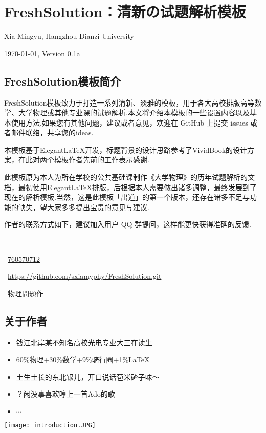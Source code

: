 \chapter{FreshSolution：清新の试题解析模板}
\centerline{Xia Mingyu, Hangzhou Dianzi University}

\centerline{\today, Version 0.1a}
\section{FreshSolution模板简介}
{
\color{Periwinkle}FreshSolution模板致力于打造一系列清新、淡雅的模板，用于各大高校排版高等数学、大学物理或其他专业课的试题解析.本文将介绍本模板的一些设置内容以及基本使用方法.如果您有其他问题，建议或者意见，欢迎在 GitHub 上提交 issues 或者邮件联络，共享您的ideas.

本模板基于Elegant\LaTeX 开发，标题背景的设计思路参考了VividBook的设计方案，在此对两个模板作者先前的工作表示感谢.

此模板原为本人为所在学校的公共基础课制作《大学物理》的历年试题解析的文档，最初使用Elegant\LaTeX 排版，后根据本人需要做出诸多调整，最终发展到了现在的解析模板.当然，这是此模板「出道」的第一个版本，还存在诸多不足与功能的缺失，望大家多多提出宝贵的意见与建议.

作者的联系方式如下，建议加入用户 QQ 群提问，这样能更快获得准确的反馈.

\begin{multicols}{2}

    \faEnvelope\ 
    
    \faQq\ \href{https://qm.qq.com/cgi-bin/qm/qr?k=gg5GsqSkGvZbC6TphVMlXRl08vqMV9Lw&authKey=rDcxqMdHwxWLQQBZwgfHduopCmVulM8CTWUhsGFOWyjqo6Ekk0omdoi4kuzxC/k4&noverify=0}{760570712}

    \faGithub\ \href{https://github.com/xiamyphys/FreshSolution.git}{https://github.com/sxiamyphy/FreshSolution.git}

    \faWechat\ \href{http://weixin.qq.com/r/hR1SSofEIdpercMp90iX}{物理問題作}
\end{multicols}

\newpage
\begin{multicols}{2}
\section{关于作者}
\bfseries
    \begin{itemize}
        \item 钱江北岸某不知名高校光电专业大三在读生
        \item 60\%物理+30\%数学+9\%骑行圈+1\%\LaTeX
        \item 土生土长的东北银儿，开口说话苞米碴子味～
        \item ？闲没事喜欢哼上一首Ado的歌
        \item $\cdots$
    \end{itemize}
    \newcolumn
    \begin{center}
        \vspace{1em}
        \texttt{[image: introduction.JPG]}
    \end{center}
\end{multicols}
\newpage
}
